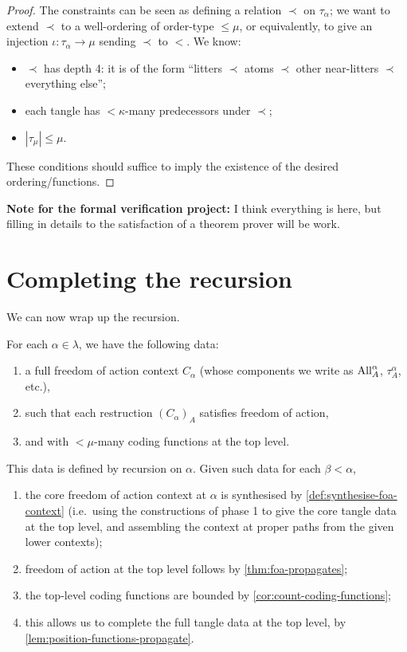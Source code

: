 \begin{proof}
  The constraints can be seen as defining a relation $\prec$ on $\tau_\alpha$; we want to extend $\prec$ to a well-ordering of order-type $\leq \mu$, or equivalently, to give an injection $\iota:\tau_\alpha \to \mu$ sending $\prec$ to $<$.  We know:
  \begin{itemize}
  \item $\prec$ has depth 4: it is of the form “litters $\prec$ atoms $\prec$ other near-litters $\prec$ everything else”;
  \item each tangle has $<\kappa$-many predecessors under $\prec$;
  \item $|\tau_\mu| \leq \mu$.
  \end{itemize}
  These conditions should suffice to imply the existence of the desired ordering/functions.
\end{proof}

{\bf Note for the formal verification project:}  I think everything is here, but filling in details to the satisfaction of a theorem prover will be work.

\section{Completing the recursion}

We can now wrap up the recursion.

\begin{definition}
  \label{def:main-recursion}
  For each $\alpha \in \lambda$, we have the following data:
  \begin{enumerate}
  \item a full freedom of action context $C_\alpha$ (whose components we write as $\mathrm{All}^\alpha_A$, $\tau^\alpha_A$, etc.),
  \item such that each restruction $(C_\alpha)_A$ satisfies freedom of action,
  \item and with $<\mu$-many coding functions at the top level.
  \end{enumerate}

  This data is defined by recursion on $\alpha$.  Given such data for each $\beta < \alpha$,
  \begin{enumerate}
  \item the core freedom of action context at $\alpha$ is synthesised by \cref{def:synthesise-foa-context} (i.e.\ using the constructions of phase 1 to give the core tangle data at the top level, and assembling the context at proper paths from the given lower contexts);
  \item freedom of action at the top level follows by \cref{thm:foa-propagates};
  \item the top-level coding functions are bounded by \cref{cor:count-coding-functions};
  \item this allows us to complete the full tangle data at the top level, by \cref{lem:position-functions-propagate}.
  \end{enumerate}
\end{definition}

